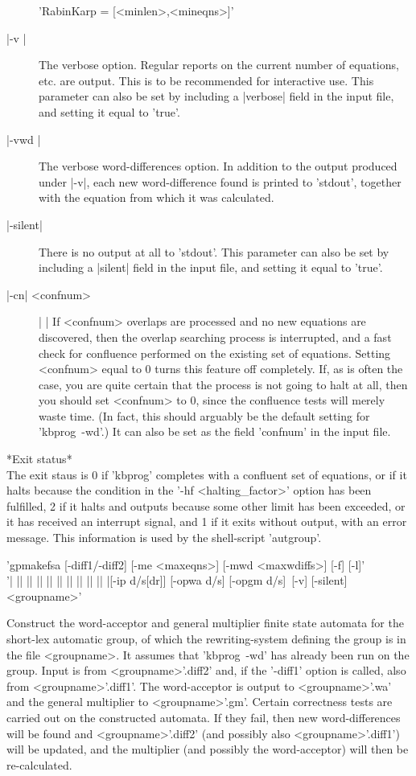 \begin{description}
'RabinKarp \:= [<minlen>,<mineqns>]'
\item[|-v |]
The verbose option. Regular reports on the current number of equations, etc. are
output. This is to be recommended for interactive use.
This parameter can also be set by including a |verbose| field in the input
file, and setting it equal to 'true'.
\item[|-vwd |]
The verbose word-differences option. In addition to the output produced
under |-v|, each new word-difference found is printed to 'stdout', together
with the equation from which it was calculated.
\item[|-silent|]
There is no output at all to 'stdout'.
This parameter can also be set by including a |silent| field in the input
file, and setting it equal to 'true'.
\item[|-cn| <confnum>] | |\newline
If <confnum> overlaps are processed and no new equations are discovered, then
the overlap searching process is interrupted, and a fast check for
confluence performed on the existing set of equations.
Setting <confnum> equal to 0 turns this feature off completely.
If, as is often the case, you are quite certain that the process is not going
to halt at all, then you should set <confnum> to 0, since the confluence
tests will merely waste time. (In fact, this should arguably be the
default setting for 'kbprog\ -wd'.)
It can also be set as the field 'confnum' in the input file.
\end{description}

*Exit status*\\
The exit staus is 0 if 'kbprog' completes with a confluent set of equations,
or if it halts because the condition in the '-hf <halting\_factor>' option
has been fulfilled,
2 if it halts and outputs because some other limit has
been exceeded, or it has received an interrupt signal, and 1 if it exits
without output, with an error message.
This information is used by the shell-script 'autgroup'.


'gpmakefsa  [-diff1/-diff2] [-me <maxeqns>] [-mwd <maxwdiffs>] [-f] [-l]'\\
'| || || || || || || || || || |[-ip d/s[dr]] [-opwa d/s] [-opgm d/s]\
[-v] [-silent] <groupname>'

Construct the word-acceptor and general multiplier finite state automata
for the short-lex automatic group, of which the rewriting-system defining
the group is in the file <groupname>.
It assumes that 'kbprog\ -wd' has already been run on the group.
Input is from <groupname>'.diff2' and, if
the '-diff1' option is called, also from <groupname>'.diff1'. The
word-acceptor is output to <groupname>'.wa' and the general multiplier to
<groupname>'.gm'. Certain correctness tests are carried out on the
constructed automata. If they fail, then new word-differences will be
found and <groupname>'.diff2' (and possibly also <groupname>'.diff1')
will be updated, and the multiplier (and possibly the word-acceptor)
will then be re-calculated.

